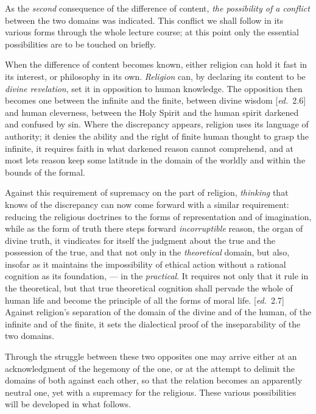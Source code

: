 \documentclass[12pt,a4paper,openany]{book}
\newcommand{\kpage}[1]{\marginnote{\footnotesize\textit{[#1]}}}
\newcommand{\ed}[1]{{\small[\textit{ed.}\ #1]}}
\begin{document}
As the \emph{second} consequence of the difference of content,
\emph{the possibility of a conflict} between the two domains was indicated. This conflict
we shall follow in its various forms through the whole lecture course;
at this point only the essential possibilities are to be touched on
briefly.

When the difference of content becomes known, either religion can hold it fast
in its interest, or philosophy in its own. \emph{Religion} can, by
declaring its content to be \emph{divine revelation}, set it in
opposition to human knowledge. The opposition then becomes one
between the infinite and the finite, between divine wisdom
\ed{2.6} and human cleverness, between the Holy Spirit and the human spirit
darkened and confused by sin. Where the discrepancy
appears, religion uses its language of authority; it
denies the ability and the right of finite human thought to grasp
the infinite, it requires faith in what darkened reason
cannot comprehend, and at most lets reason keep some latitude
in the domain of the worldly and within the bounds of the formal.

Against this requirement of supremacy on the part of religion,
\emph{thinking} that knows of the discrepancy can now come forward with a
similar requirement: reducing the religious doctrines to
the forms of representation and of imagination, while as the form of truth
there steps forward \emph{incorruptible} reason, the organ of divine
truth, it vindicates for itself the judgment about the true and the possession
of the true, and that not only in the \emph{theoretical} domain, but
also, insofar as it maintains the impossibility of ethical action without
a rational cognition as its foundation, --- in the \emph{practical}. It requires
not only that it rule in the theoretical, but that true theoretical
cognition shall pervade the whole of human life and
become the principle of all the forms of moral life. \ed{2.7} Against religion's
separation of the domain of the divine and of the human, of the
\kpage{81}infinite and of the finite, it sets the dialectical proof
of the inseparability of the two domains.

Through the struggle between these two opposites one may arrive
either at an acknowledgment of the hegemony of the one, or at the attempt
to delimit the domains of both against each other, so that the relation
becomes an apparently neutral one, yet with a supremacy
for the religious. These various possibilities will be developed
in what follows.
\end{document}
